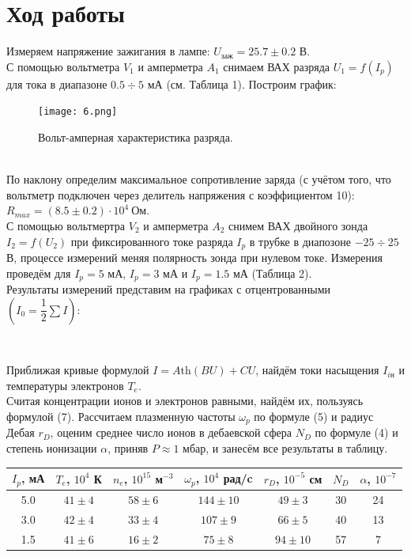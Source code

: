 \documentclass[a4paper,12pt]{article}
\begin{document}
\section*{Ход работы}
Измеряем напряжение зажигания в лампе: $U_{\text{заж}} = 25.7\pm 0.2$ В.\\
С помощью вольтметра $V_1$ и амперметра $A_1$ снимаем ВАХ разряда $U_1=f(I_p)$ для тока в диапазоне $0.5 \div 5$ мА (см. Таблица 1).
Построим график:\\
\begin{figure}[h]
\centering
\texttt{[image: 6.png]}
\caption{Вольт-амперная характеристика разряда.}
\end{figure}\\
По наклону определим максимальное сопротивление заряда (с учётом того, что вольтметр подключен через делитель напряжения с коэффициентом 10): $R_{max} = (8.5\pm 0.2)\cdot 10^4~\text{Ом}$.\\
С помощью вольтмертра $V_2$ и амперметра $A_2$ снимем ВАХ двойного зонда $I_2 = f(U_2)$ при фиксированного токе разряда $I_p$ в трубке в диапозоне $-25 \div 25$ В, процессе измерений меняя полярность зонда при нулевом токе. Измерения проведём для $I_p = 5$ мА, $I_p = 3$ мА  и $I_p = 1.5$ мА (Таблица 2).\\
Результаты измерений представим на графиках с отцентрованными $\left(I_0 = \dfrac{1}{2}\sum I\right)$:
\newpage
\begin{figure}[h]
    \centering
    \\
\end{figure}
Приближая кривые формулой $I = A \text{th}(BU) + CU$, найдём токи насыщения $I_{i\text{н}}$ и температуры электронов $T_e$.\\
Считая концентрации ионов и электронов равными, найдём их, пользуясь формулой (7). Рассчитаем плазменную частоты $\omega_p$ по формуле (5) и радиус Дебая $r_D$, оценим среднее число ионов в дебаевской сфера $N_D$ по формуле (4) и  степень ионизации $\alpha$, приняв $P\approx 1$ мбар, и занесём все результаты в таблицу.
\begin{table}[h!]
\centering
\begin{tabular}{|c|c|c|c|c|c|c|}
\hline
$I_p$, мА  & $T_e$, $10^4$ К   & $n_e$, $10^{15}$ м$^{-3}$ & $\omega_p$, $10^4$ рад/c & $r_D$, $10^{-5}$ см & $N_D$ & $\alpha$, $10^{-7}$ \\ \hline
5.0   & $41\pm 4$ & $58\pm 6$                     & $144\pm 10$                   & $49\pm 3$                      & 30 & 24\\ \hline
3.0   & $42\pm 4$ & $33\pm 4$                     & $107\pm 9$                    & $66\pm 5$                      & 40 & 13\\ \hline
1.5   & $41\pm 6$ & $16\pm 2$                    & $75\pm 8$                     & $94 \pm 10$                     & 57 & 7\\ \hline
\end{tabular}
\end{table}
\newpage
\end{document}
